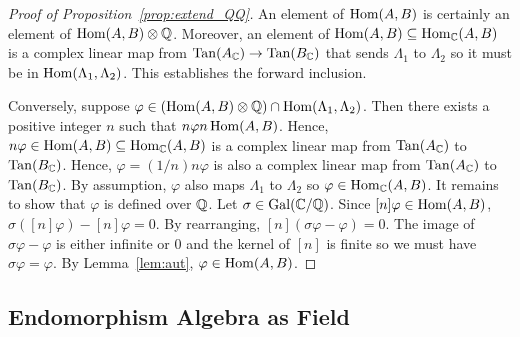 \begin{proof}[Proof of Proposition~\ref{prop:extend_QQ}]
    An element of $\operatorname{Hom}(A, B)$ is certainly an element of $\operatorname{Hom}(A, B)\otimes
    \mathbb{Q}$. Moreover, an element of $\operatorname{Hom}(A, B) \subseteq \operatorname{Hom}_{\mathbb{C}} (A,B)$ is a
    complex linear map from $\operatorname{Tan}(A_{\mathbb{C}})\to \operatorname{Tan}(B_{\mathbb{C}})$ that sends $\Lambda_1$
    to $\Lambda_2$ so it must be in $\operatorname{Hom}(\Lambda_1,\Lambda_2)$. This
    establishes the forward inclusion.

    Conversely, suppose $\varphi\in (\operatorname{Hom}(A, B)\otimes \mathbb{Q})\cap \operatorname{Hom}(\Lambda_1,
    \Lambda_2)$. Then there exists a positive integer $n$ such that $n\varphi n
    \operatorname{Hom}(A, B)$. Hence, $n\varphi\in \operatorname{Hom}(A,B)\subseteq \operatorname{Hom}_{\mathbb{C}}(A, B)$ is a
    complex linear map from $\operatorname{Tan}(A_{\mathbb{C}})$ to $\operatorname{Tan}(B_{\mathbb{C}})$. Hence,
    $\varphi=(1/n)n\varphi$ is also a complex linear map from $\operatorname{Tan}(A_{\mathbb{C}})$ to
    $\operatorname{Tan}(B_{\mathbb{C}})$. By assumption, $\varphi$ also maps $\Lambda_1$ to
    $\Lambda_2$ so $\varphi\in \operatorname{Hom}_{\mathbb{C}}(A,B)$. It remains to show that
    $\varphi$ is defined over $\mathbb{Q}$. Let $\sigma\in \operatorname{Gal}(\mathbb{C}/\mathbb{Q})$. Since
    $[n]\varphi\in \operatorname{Hom}(A,B)$, $\sigma([n]\varphi)-[n]\varphi=0$. By
    rearranging, $[n](\sigma\varphi-\varphi)=0$. The image of
    $\sigma\varphi-\varphi$ is either infinite or 0 and the kernel of $[n]$ is
    finite so we must have $\sigma\varphi=\varphi$. By Lemma~\ref{lem:aut},
    $\varphi\in \operatorname{Hom}(A,B)$.
\end{proof}

\subsection{Endomorphism Algebra as Field}%
\label{sub:endomorphism_algebra_as_field}

